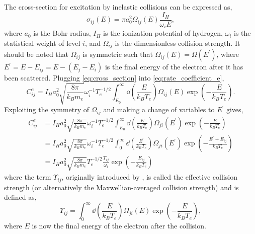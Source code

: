 The cross-section for excitation by inelastic collisions can be expressed as,
\begin{equation}\label{eq:cross_section}
    \sigma_{ij}(E) = \pi a_0^2 \Omega_{ij}(E)\frac{I_H}{\omega_iE},
\end{equation}
where $a_0$ is the Bohr radius, $I_H$ is the ionization potential of hydrogen, $\omega_i$ is the statistical weight of level $i$, and $\Omega_{ij}$ is the dimensionless collision strength. It should be noted that $\Omega_{ij}$ is symmetric such that $\Omega_{ij}(E)=\Omega(E^{\prime})$, where $E^{\prime}=E - E_{ij} = E - (E_j - E_i)$ is the final energy of the electron after it has been scattered. Plugging \autoref{eq:cross_section} into \autoref{eq:rate_coefficient_e},
\begin{equation}
    C^e_{ij} = I_Ha_0^2\sqrt{\frac{8\pi}{k_Bm_e}}\omega_i^{-1}T_e^{-1/2}\int_{E_0}^{\infty}\dd{\left(\frac{E}{k_BT_e}\right)}\Omega_{ij}(E)\exp{\left(-\frac{E}{k_BT_e}\right)}.
\end{equation}
Exploiting the symmetry of $\Omega_{ij}$ and making a change of variables to $E^{\prime}$ gives,
\begin{align}\label{eq:rate_coefficient_final}
    C^e_{ij} &= I_Ha_0^2\sqrt{\frac{8\pi}{k_Bm_e}}\omega_i^{-1}T_e^{-1/2}\int_{E_0}^{\infty}\dd{\left(\frac{E}{k_BT_e}\right)}\Omega_{ji}(E^\prime)\exp{\left(-\frac{E}{k_BT_e}\right)} \nonumber\\
    &= I_Ha_0^2\sqrt{\frac{8\pi}{k_Bm_e}}\omega_i^{-1}T_e^{-1/2}\int_{0}^{\infty}\dd{\left(\frac{E^\prime}{k_BT_e}\right)}\Omega_{ji}(E^\prime)\exp{\left(-\frac{E^\prime + E_{ij}}{k_BT_e}\right)} \nonumber\\
    &= I_Ha_0^2\sqrt{\frac{8\pi}{k_Bm_e}}T_e^{-1/2}\frac{\Upsilon_{ij}}{\omega_i}\exp{\left(-\frac{E_{ij}}{k_BT_e}\right)}
\end{align}
where the term $\Upsilon_{ij}$, originally introduced by \citet{seaton_electron_1953}, is called the effective collision strength (or alternatively the Maxwellian-averaged collision strength) and is defined as,
\begin{equation}\label{eq:effective_collision_strength}
    \Upsilon_{ij} = \int_{0}^{\infty}\dd{\left(\frac{E}{k_BT_e}\right)}\Omega_{ji}(E)\exp{\left(-\frac{E}{k_BT_e}\right)},
\end{equation}
where $E$ is now the final energy of the electron after the collision.

